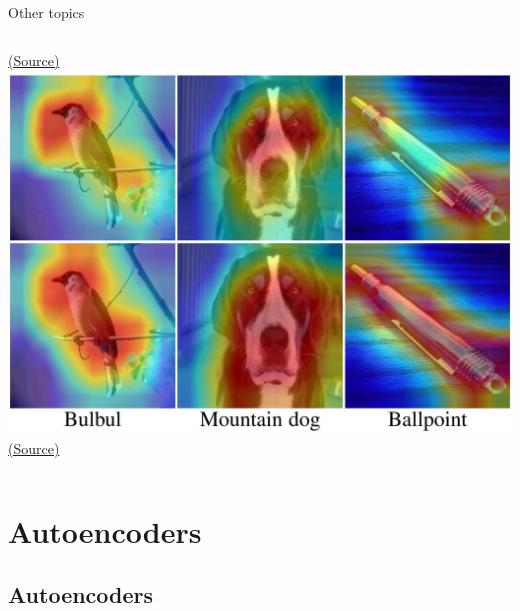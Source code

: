 \documentclass[10pt,compress]{beamer} %
\begin{document}
\begin{frame}{Other topics}
\begin{columns}
	    \scriptsize\href{https://www.researchgate.net/figure/Example-of-2D-semantic-segmentation-Top-input-image-Bottom-prediction_fig3_326875064}{(Source)}\\
	    \includegraphics[width=\linewidth]{figs/attention.jpg}\\
	    \scriptsize\href{https://blog.paperspace.com/attention-mechanisms-in-computer-vision-cbam/}{(Source)}\\
    \end{columns}
\end{frame}



\section{Autoencoders}

\subsection{Autoencoders}
\end{document}
